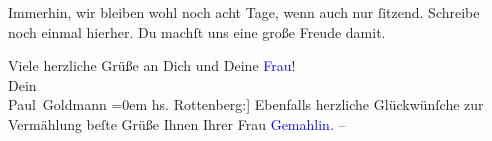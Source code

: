 \pstart
           Immerhin, wir bleiben wohl noch acht Tage, wenn auch nur ſitzend. Schreibe noch
               einmal hierher. Du machſt uns eine große Freude damit.\pend
           
\pstart
           Viele herzliche Grüße an Dich und Deine \textcolor{blue}{Frau}{}\ledrightnote{{$\rightarrow$}\textcolor{blue}{Olga Schnitzler}}! {\\[\baselineskip]}Dein {\\[\baselineskip]}\spacefill\mbox{Paul Goldmann}\pend
           \leftskip=0em{}
\pstart
           \noindent{}{[}hs. Rottenberg:{]} Ebenfalls herzliche Glückwünſche zur Vermählung {\kaufmannsund} beſte Grüße Ihnen {\kaufmannsund}
                  Ihrer Frau \textcolor{blue}{Gemahlin}{}\ledrightnote{\textcolor{blue}{Olga Schnitzler}}. –\pend
           \endnumbering{}
\begin{anhang}
\end{anhang}
      
